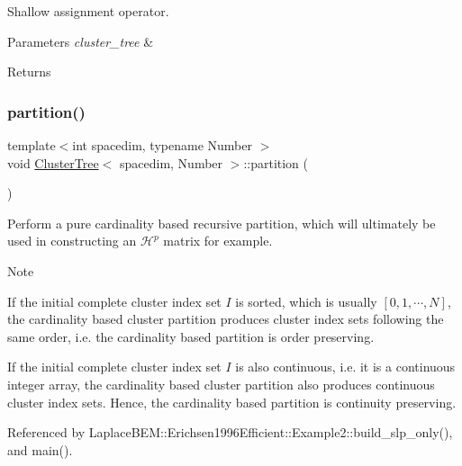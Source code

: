Shallow assignment operator.


\begin{DoxyParams}{Parameters}
{\em cluster\+\_\+tree} & \\
\hline
\end{DoxyParams}
\begin{DoxyReturn}{Returns}

\end{DoxyReturn}
\mbox{\label{classClusterTree_aa514c3b75864d5f7be72315a30079cfe}} 
\subsubsection{\texorpdfstring{partition()}{partition()}\hspace{0.1cm}{\footnotesize\ttfamily [1/3]}}
{\footnotesize\ttfamily template$<$int spacedim, typename Number $>$ \\
void \hyperlink{classClusterTree}{Cluster\+Tree}$<$ spacedim, Number $>$\+::partition (\begin{DoxyParamCaption}{ }\end{DoxyParamCaption})}

Perform a pure cardinality based recursive partition, which will ultimately be used in constructing an $\mathcal{H}^p$ matrix for example.


\begin{DoxyDescription}
\item[Note ]
\begin{DoxyEnumerate}
\item If the initial complete cluster index set $I$ is sorted, which is usually $[0, 1, \cdots, N]$, the cardinality based cluster partition produces cluster index sets following the same order, i.\+e. the cardinality based partition is order preserving.
\item If the initial complete cluster index set $I$ is also continuous, i.\+e. it is a continuous integer array, the cardinality based cluster partition also produces continuous cluster index sets. Hence, the cardinality based partition is continuity preserving.  
\end{DoxyEnumerate}
\end{DoxyDescription}

Referenced by Laplace\+B\+E\+M\+::\+Erichsen1996\+Efficient\+::\+Example2\+::build\+\_\+slp\+\_\+only(), and main().


